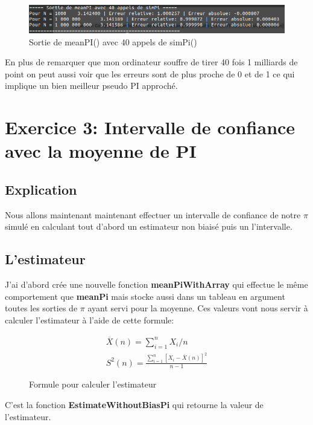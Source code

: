 \documentclass[12pt,french]{article} %
\begin{document}
\begin{figure}[H]
	\centering
	\includegraphics[scale=0.6]{exo2-2.png}
	\caption{Sortie de meanPI() avec 40 appels de simPi()}
\end{figure}

En plus de remarquer que mon ordinateur souffre de tirer 40 fois 1 milliards de point on peut aussi voir que les erreurs sont de plus proche de 0 et de 1 ce qui implique un bien meilleur pseudo PI approché.


\section{Exercice 3: Intervalle de confiance avec la moyenne de PI}

\subsection{Explication}

Nous allons maintenant maintenant effectuer un intervalle de confiance de notre $\pi$ simulé en calculant tout d'abord un estimateur non biaisé puis un l'intervalle.

\subsection{L'estimateur}

J'ai d'abord crée une nouvelle fonction \textbf{meanPiWithArray} qui effectue le même comportement que \textbf{meanPi} mais stocke aussi dans un tableau en argument toutes les sorties de $\pi$ ayant servi pour la moyenne. Ces valeurs vont nous servir à calculer l'estimateur à l'aide de cette formule:

\begin{figure}[H]
	\centering
	\begin{align}
		\overline{X}(n) = \sum_{i = 1}^{n} X_{i} / n \\
		S^{2}(n) = \frac{\sum_{i = 1}^{n} [X_{i} - \overline{X}(n)]^{2}}{n - 1}
	\end{align}
	\caption{Formule pour calculer l'estimateur} 
\end{figure}

C'est la fonction \textbf{EstimateWithoutBiasPi} qui retourne la valeur de l'estimateur.
\end{document}
